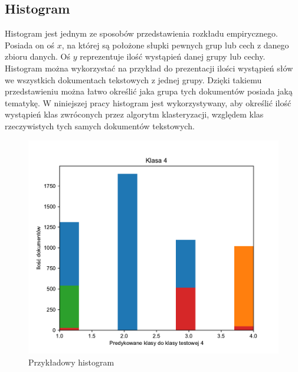     \subsection{Histogram} \label{sec:histogram}
    Histogram jest jednym ze sposobów przedstawienia rozkładu empirycznego. Posiada on oś $x$, na której są położone słupki pewnych grup lub cech z danego zbioru danych. Oś $y$ reprezentuje ilość wystąpień danej grupy lub cechy. Histogram można wykorzystać na przykład do prezentacji ilości wystąpień słów we wszystkich dokumentach tekstowych z jednej grupy. Dzięki takiemu przedstawieniu można łatwo określić jaka grupa tych dokumentów posiada jaką tematykę. W niniejszej pracy histogram jest wykorzystywany, aby określić ilość wystąpień klas zwróconych przez algorytm klasteryzacji, względem klas rzeczywistych tych samych dokumentów tekstowych.
    \begin{figure}[h!]
        \centering
    \includegraphics[width=0.7\linewidth]{Rysunki/Rozdzial2/Figure_2.pdf}
    \caption{Przykładowy histogram}
    \label{fig:histogram}
    \end{figure}
    
    \newpage
    
